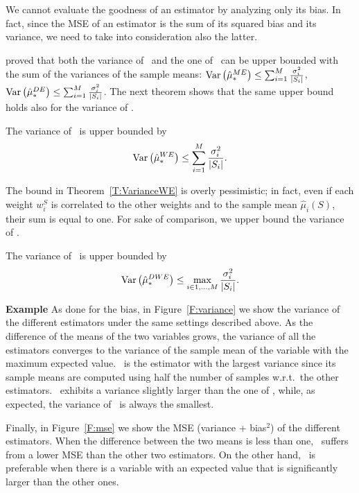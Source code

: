 We cannot evaluate the goodness of an estimator by analyzing only its bias.
In fact, since the MSE of an estimator is the sum of its squared bias and its variance, we need to take into consideration also the latter.

\citet{van2013estimating} proved that both the variance of \ME~and the one of \CV~can be upper bounded with the sum of the variances of the sample means:
$ \mathrm{Var}\left(\hat\mu_*^{ME}\right) \leq \sum_{i=1}^M \frac{\sigma^2_i}{|S_i|}$, $\mathrm{Var}\left(\hat\mu_*^{DE}\right) \leq \sum_{i=1}^M \frac{\sigma^2_i}{|S_i|}$.
The next theorem shows that the same upper bound holds also for the variance of \WE.
\begin{theorem}\label{T:VarianceWE}
 The variance of \WE~is upper bounded by
 $$\mathrm{Var}\left(\hat\mu_*^{WE}\right) \leq \sum_{i=1}^M \frac{\sigma^2_i}{|S_i|}.$$
\end{theorem}
The bound in Theorem~\ref{T:VarianceWE} is overly pessimistic; in fact, even if each weight $w_i^S$ is correlated to the other weights and to the sample mean $\hat\mu_i(S)$, their sum is equal to one.
For sake of comparison, we upper bound the variance of \OWE.
\begin{theorem}\label{T:VarianceOWE}
 The variance of \OWE~is upper bounded by
 $$\mathrm{Var}\left(\hat\mu_*^{DWE}\right) \leq \max_{i\in{1,\dots,M}} \frac{\sigma^2_i}{|S_i|}.$$
\end{theorem}

\textbf{Example} As done for the bias, in Figure~\ref{F:variance} we show the variance of the different estimators under the same settings described above.
As the difference of the means of the two variables grows, the variance of all the estimators converges to the variance of the sample mean of the variable with the maximum expected value.
\CV~is the estimator with the largest variance since its sample means are computed using half the number of samples w.r.t.~the other estimators.
\WE~exhibits a variance slightly larger than the one of \ME, while, as expected, the variance of \OWE~is always the smallest.

Finally, in Figure~\ref{F:mse} we show the MSE (variance + bias$^2$) of the different estimators.
When the difference between the two means is less than one, \WE~suffers from a lower MSE than the other two estimators.
On the other hand, \ME~is preferable when there is a variable with an expected value that is significantly larger than the other ones.
